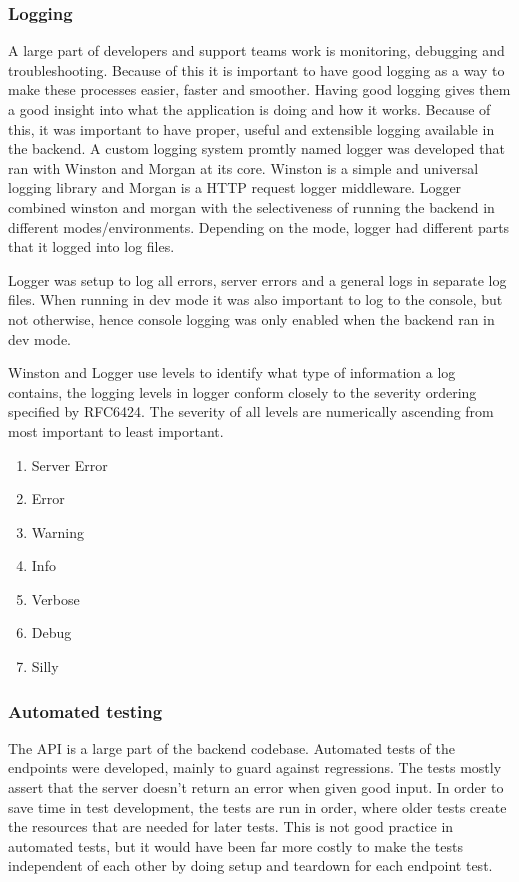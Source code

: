 \subsubsection{Logging}
A large part of developers and support teams work is monitoring, debugging and troubleshooting. Because of this it is important to have good logging as a way to make these processes easier, faster and smoother. Having good logging gives them a good insight into what the application is doing and how it works. Because of this, it was important to have proper, useful and extensible logging available in the backend. A custom logging system promtly named logger was developed that ran with Winston and Morgan at its core. Winston is a simple and universal logging library and Morgan is a HTTP request logger middleware. Logger combined winston and morgan with the selectiveness of running the backend in different modes/environments. Depending on the mode, logger had different parts that it logged into log files.

Logger was setup to log all errors, server errors and a general logs in separate log files. When running in dev mode it was also important to log to the console, but not otherwise, hence console logging was only enabled when the backend ran in dev mode.

Winston and Logger use levels to identify what type of information a log contains, the logging levels in logger conform closely to the severity ordering specified by RFC6424.
The severity of all levels are numerically ascending from most important to least important.
\begin{enumerate}
  \item Server Error
  \item Error
  \item Warning
  \item Info
  \item Verbose
  \item Debug
  \item Silly
\end{enumerate}

\subsubsection{Automated testing}
The API is a large part of the backend codebase. Automated tests of the endpoints were developed, mainly to guard against regressions. The tests mostly assert that the server doesn't return an error when given good input. In order to save time in test development, the tests are run in order, where older tests create the resources that are needed for later tests. This is not good practice in automated tests, but it would have been far more costly to make the tests independent of each other by doing setup and teardown for each endpoint test.

